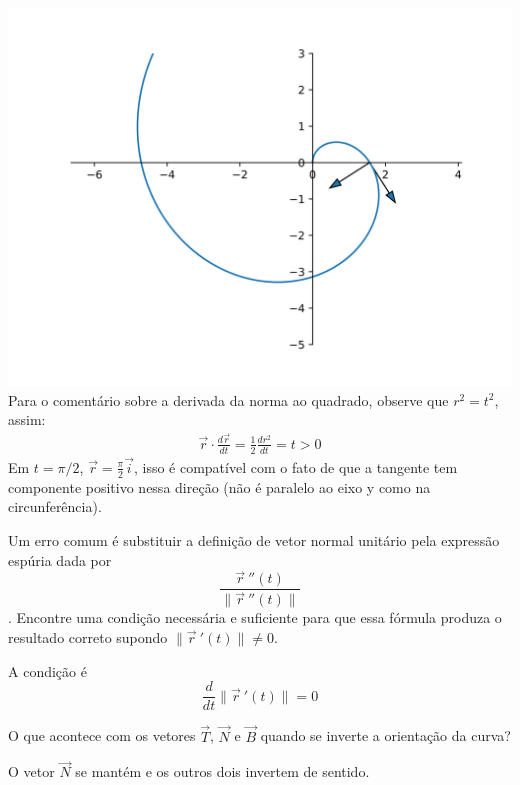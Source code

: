 \begin{resp}
\includegraphics[scale=.8]{./cap_curvas/figs//espiral_lista_a1}
Para o comentário sobre a derivada da norma ao quadrado, observe que $r^2=t^2$, assim:
\begin{eqnarray*}
\vec{r}\cdot\frac{d\vec{r}}{dt}=\frac{1}{2}\frac{d r^2}{dt}=t>0
\end{eqnarray*}
Em $t=\pi/2$, $\vec{r} = \frac{\pi}{2}\vec{i}$, isso é compatível com o fato de que a tangente tem componente positivo nessa direção (não é paralelo ao eixo y como na circunferência).
\end{resp}


\begin{exer}Um erro comum é substituir a definição de vetor normal unitário pela expressão espúria dada por $$\frac{\vec{r}\!~''(t)}{\|\vec{r}\!~''(t)\|}$$. Encontre uma condição necessária e suficiente para que essa fórmula produza o resultado correto supondo $\|\vec{r}\!~'(t)\|\neq 0$.

\end{exer}
\begin{resp}
  A condição é $$\frac{d}{dt}\|\vec{r}\!~'(t)\|=0$$
\end{resp}

\begin{exer} O que acontece com os vetores $\vec{T}$, $\vec{N}$ e $\vec{B}$ quando se inverte a orientação da curva?
\end{exer}
\begin{resp} O vetor $\vec{N}$ se mantém e os outros dois invertem de sentido.
\end{resp}




